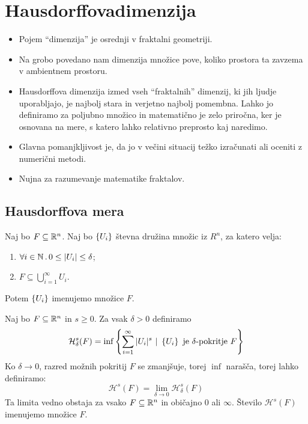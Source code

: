 \section{Hausdorffovadimenzija}
\begin{itemize}
    \item Pojem "`dimenzija"' je osrednji v fraktalni geometriji.
    \item Na grobo povedano nam dimenzija množice pove, koliko prostora ta zavzema v ambientnem prostoru.
    \item Hausdorffova dimenzija izmed vseh "`fraktalnih"' dimenzij, ki jih ljudje uporabljajo, je najbolj stara in verjetno najbolj pomembna. Lahko jo definiramo za poljubno množico in matematično je zelo priročna, ker je osnovana na mere, s katero lahko relativno preprosto kaj naredimo.
    \item Glavna pomanjkljivost je, da jo v večini situacij težko izračunati ali oceniti z numerični metodi.
    \item Nujna za razumevanje matematike fraktalov.
\end{itemize}

\subsection{Hausdorffova mera}
\begin{definicija}
    Naj bo \(F \subseteq \mathbb{R}^n\). Naj bo \(\left\{U_i\right\}\) števna družina množic iz \(R^n\), za katero velja:
    \begin{enumerate}
        \item \(\forall i \in \mathbb{N} \,.\, 0 \leq |U_i| \leq \delta\);
        \item \(F \subseteq \bigcup_{i=1}^\infty U_i\).
    \end{enumerate}
    Potem \(\left\{U_i\right\}\) imenujemo  množice \(F\).
\end{definicija}
%
Naj bo \(F \subseteq \mathbb{R}^n\) in \(s \geq 0\). Za vsak \(\delta > 0\) definiramo 
\[\mathcal{H}^s_\delta(F) = \inf \left\{\sum_{i=1}^{\infty}|U_i|^s \ | \ \left\{U_i\right\} \ \text{je \(\delta\)-pokritje \(F\)}\right\}\]
%
Ko \(\delta \to 0\), razred možnih pokritij \(F\) se zmanjšuje, torej \(\inf\) narašča, torej lahko definiramo:
\[\mathcal{H}^s(F) = \lim_{\delta \to 0} \mathcal{H}^s_\delta(F)\]
Ta limita vedno obstaja za vsako \(F \subseteq \mathbb{R}^n\) in običajno \(0\) ali \(\infty\). Število \(\mathcal{H}^s(F)\) imenujemo  množice \(F\).

